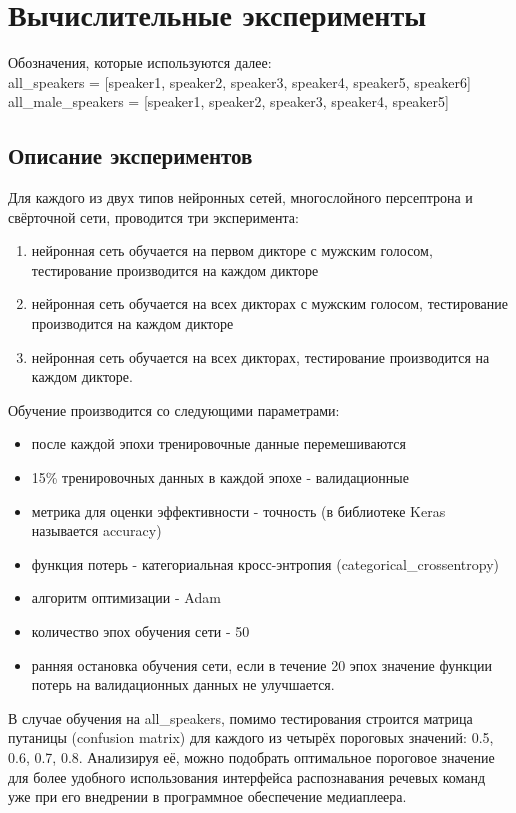 \section{Вычислительные эксперименты}
Обозначения, которые используются далее: \\
all\_speakers = [speaker1, speaker2, speaker3, speaker4, speaker5, speaker6] \\
all\_male\_speakers = [speaker1, speaker2, speaker3, speaker4, speaker5]
\subsection{Описание экспериментов}
Для каждого из двух типов нейронных сетей, многослойного персептрона и свёрточной сети, проводится три эксперимента:
\begin{enumerate}[leftmargin=2cm]
	\item нейронная сеть обучается на первом дикторе с мужским голосом, тестирование производится на каждом дикторе
	\item нейронная сеть обучается на всех дикторах с мужским голосом, тестирование производится на каждом дикторе
	\item нейронная сеть обучается на всех дикторах, тестирование производится на каждом дикторе.
\end{enumerate}

Обучение производится со следующими параметрами:
\begin{itemize}[leftmargin=2cm]
	\item после каждой эпохи тренировочные данные перемешиваются
	\item 15\% тренировочных данных в каждой эпохе - валидационные
	\item метрика для оценки эффективности - точность (в библиотеке Keras называется accuracy)
	\item функция потерь - категориальная кросс-энтропия (categorical\_crossentropy)
	\item алгоритм оптимизации - Adam
	\item количество эпох обучения сети - 50
	\item ранняя остановка обучения сети, если в течение 20 эпох значение функции потерь на валидационных данных не улучшается.
\end{itemize}

В случае обучения на all\_speakers, помимо тестирования строится матрица путаницы (confusion matrix) для каждого из четырёх пороговых значений: 0.5, 0.6, 0.7, 0.8. Анализируя её, можно подобрать оптимальное пороговое значение для более удобного использования интерфейса распознавания речевых команд уже при его внедрении в программное обеспечение медиаплеера. 

